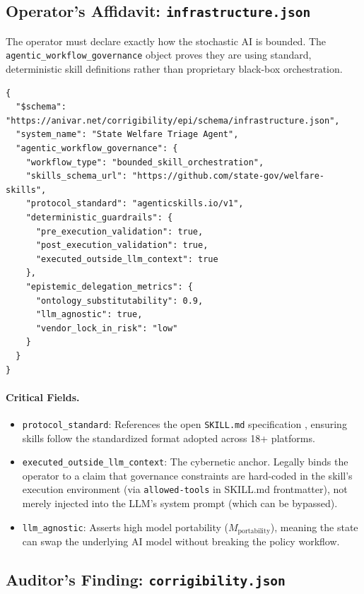 \documentclass[11pt,a4paper]{article}
\theoremstyle{definition}
\begin{document}
\subsection{Operator's Affidavit: \texttt{infrastructure.json}}

The operator must declare exactly how the stochastic AI is bounded. The \texttt{agentic\_workflow\_governance} object proves they are using standard, deterministic skill definitions rather than proprietary black-box orchestration.

\begin{verbatim}
{
  "$schema": "https://anivar.net/corrigibility/epi/schema/infrastructure.json",
  "system_name": "State Welfare Triage Agent",
  "agentic_workflow_governance": {
    "workflow_type": "bounded_skill_orchestration",
    "skills_schema_url": "https://github.com/state-gov/welfare-skills",
    "protocol_standard": "agenticskills.io/v1",
    "deterministic_guardrails": {
      "pre_execution_validation": true,
      "post_execution_validation": true,
      "executed_outside_llm_context": true
    },
    "epistemic_delegation_metrics": {
      "ontology_substitutability": 0.9,
      "llm_agnostic": true,
      "vendor_lock_in_risk": "low"
    }
  }
}
\end{verbatim}

\paragraph{Critical Fields.}
\begin{itemize}[noitemsep]
    \item \texttt{protocol\_standard}: References the open \texttt{SKILL.md} specification \citep{agentskills2025}, ensuring skills follow the standardized format adopted across 18+ platforms.
    \item \texttt{executed\_outside\_llm\_context}: The cybernetic anchor. Legally binds the operator to a claim that governance constraints are hard-coded in the skill's execution environment (via \texttt{allowed-tools} in SKILL.md frontmatter), not merely injected into the LLM's system prompt (which can be bypassed).
    \item \texttt{llm\_agnostic}: Asserts high model portability ($M_{\text{portability}}$), meaning the state can swap the underlying AI model without breaking the policy workflow.
\end{itemize}

\subsection{Auditor's Finding: \texttt{corrigibility.json}}
\end{document}
